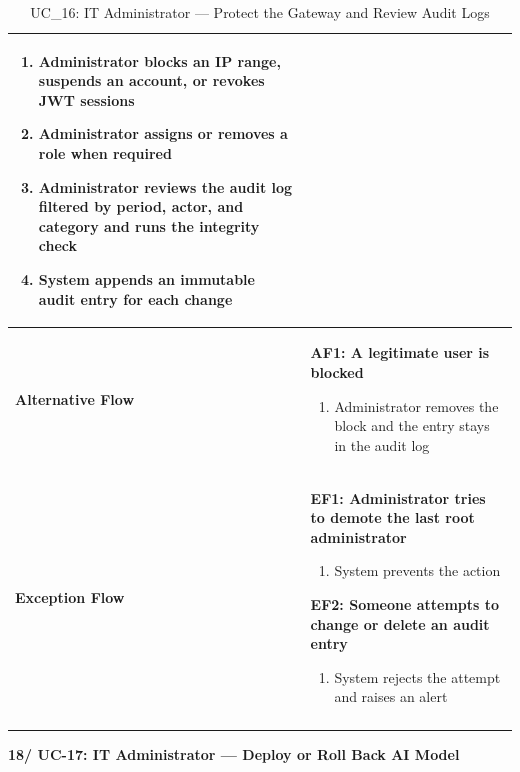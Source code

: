 \documentclass[a4paper]{article}
\newlength{\ucLeft}
\begin{document}
\begin{longtable}{|>{\bfseries}p{\ucLeft}|p{\dimexpr\linewidth-\ucLeft-2\tabcolsep-2\arrayrulewidth}|}
\begin{enumerate}[leftmargin=1.5em, nosep, topsep=2pt, partopsep=0pt, parsep=0pt, after=\strut]
    \item Administrator blocks an IP range, suspends an account, or revokes JWT sessions
    \item Administrator assigns or removes a role when required
    \item Administrator reviews the audit log filtered by period, actor, and category and runs the integrity check
    \item System appends an immutable audit entry for each change
\end{enumerate}
\\ \hline
Alternative Flow &
\textbf{AF1: A legitimate user is blocked}
\begin{enumerate}[leftmargin=1.5em, nosep, topsep=2pt, partopsep=0pt, parsep=0pt, after=\strut]
    \item Administrator removes the block and the entry stays in the audit log
\end{enumerate}
\\ \hline
Exception Flow &
\textbf{EF1: Administrator tries to demote the last root administrator}
\begin{enumerate}[leftmargin=1.5em, nosep, topsep=2pt, partopsep=0pt, parsep=0pt, after=\strut]
    \item System prevents the action
\end{enumerate}
\textbf{EF2: Someone attempts to change or delete an audit entry}
\begin{enumerate}[leftmargin=1.5em, nosep, topsep=2pt, partopsep=0pt, parsep=0pt, after=\strut]
    \item System rejects the attempt and raises an alert
\end{enumerate}
\\ \hline
\caption{UC\_16: IT Administrator --- Protect the Gateway and Review Audit Logs}\label{tab:uc16_gateway}
\end{longtable}

\vspace{0.5em}
\noindent\textbf{18/ UC-17: IT Administrator --- Deploy or Roll Back AI Model}
\end{document}
